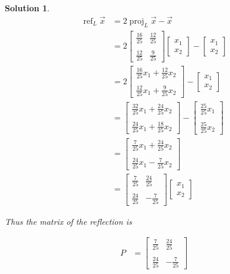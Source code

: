 \documentclass{article}
\newtheorem*{solution}{Solution}
\DeclareMathOperator{\proj}{proj}
\DeclareMathOperator{\refl}{ref}
\newcommand{\vectorproj}[2][]{\proj_{#1}#2}
\newcommand{\vectorrefl}[2][]{\refl_{#1}#2}
\begin{document}
\begin{solution}
\begin{align*}
\vectorrefl[L]{\vec{x}} &= 2 \vectorproj[L]{\vec{x}} - \vec{x} \\
&= 2 \begin{bmatrix} \frac{16}{25} & \frac{12}{25} \\ \\ \frac{12}{25} & \frac{9}{25}\end{bmatrix} \begin{bmatrix} x_{1} \\ x_{2} \end{bmatrix} - \begin{bmatrix} x_{1} \\ x_{2} \end{bmatrix} \\
&= 2 \begin{bmatrix} \frac{16}{25}x_{1} + \frac{12}{25}x_{2} \\ \\ \frac{12}{25}x_{1} + \frac{9}{25}x_{2}\end{bmatrix} - \begin{bmatrix} x_{1} \\ x_{2} \end{bmatrix} \\
&= \begin{bmatrix} \frac{32}{25}x_{1} + \frac{24}{25}x_{2} \\ \\ \frac{24}{25}x_{1} + \frac{18}{25}x_{2}\end{bmatrix} - \begin{bmatrix} \frac{25}{25} x_{1} \\ \\ \frac{25}{25} x_{2} \end{bmatrix} \\
&= \begin{bmatrix} \frac{7}{25}x_{1} + \frac{24}{25}x_{2} \\ \\ \frac{24}{25}x_{1} - \frac{7}{25}x_{2}\end{bmatrix} \\
&= \begin{bmatrix} \frac{7}{25} & \frac{24}{25} \\ \\ \frac{24}{25} & -\frac{7}{25}\end{bmatrix} \begin{bmatrix} x_{1} \\ x_{2} \end{bmatrix}
\end{align*}

Thus the matrix of the reflection is 

\begin{align*}
P &= \begin{bmatrix} \frac{7}{25} & \frac{24}{25} \\ \\ \frac{24}{25} & -\frac{7}{25}\end{bmatrix}
\end{align*}
\end{solution}
\end{document}
